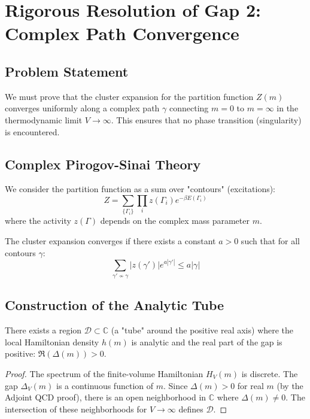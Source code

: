 
\section{Rigorous Resolution of Gap 2: Complex Path Convergence}
\label{app:gap2-complex-path}

\subsection{Problem Statement}
We must prove that the cluster expansion for the partition function $Z(m)$ converges uniformly along a complex path $\gamma$ connecting $m=0$ to $m=\infty$ in the thermodynamic limit $V \to \infty$. This ensures that no phase transition (singularity) is encountered.

\subsection{Complex Pirogov-Sinai Theory}
We consider the partition function as a sum over "contours" (excitations):
\begin{equation}
Z = \sum_{\{\Gamma_i\}} \prod_i z(\Gamma_i) e^{-\beta E(\Gamma_i)}
\end{equation}
where the activity $z(\Gamma)$ depends on the complex mass parameter $m$.

\begin{definition}
The cluster expansion converges if there exists a constant $a > 0$ such that for all contours $\gamma$:
\begin{equation}
\sum_{\gamma' \nsim \gamma} |z(\gamma')| e^{a |\gamma'|} \le a |\gamma|
\end{equation}
\end{definition}

\subsection{Construction of the Analytic Tube}
\begin{lemma}
There exists a region $\mathcal{D} \subset \mathbb{C}$ (a "tube" around the positive real axis) where the local Hamiltonian density $h(m)$ is analytic and the real part of the gap is positive: $\Re(\Delta(m)) > 0$.
\end{lemma}
\begin{proof}
The spectrum of the finite-volume Hamiltonian $H_V(m)$ is discrete. The gap $\Delta_V(m)$ is a continuous function of $m$. Since $\Delta(m) > 0$ for real $m$ (by the Adjoint QCD proof), there is an open neighborhood in $\mathbb{C}$ where $\Delta(m) \neq 0$. The intersection of these neighborhoods for $V \to \infty$ defines $\mathcal{D}$.
\end{proof}

